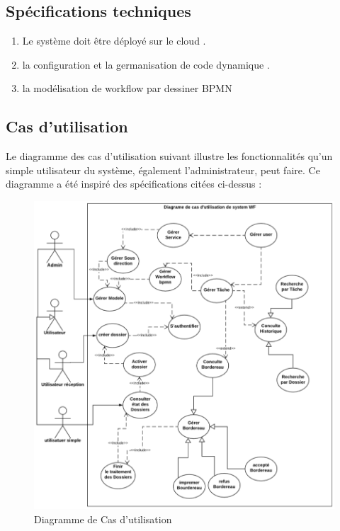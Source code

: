  
 
 
  \subsection{Spécifications techniques }
 
 
 
  \begin{enumerate}
 	\item  	   Le système doit être déployé sur le cloud  .
 	\item  	    la configuration et la germanisation de code dynamique . 
 	\item  	  la modélisation de workflow par dessiner  BPMN
 	
 
 	
 \end{enumerate}
 
 
 
 
 
 
 
 
 
 
 
 \subsection{ Cas d’utilisation }
 Le diagramme des cas d’utilisation suivant illustre les fonctionnalités qu’un simple utilisateur du système, également l’administrateur, peut faire. Ce diagramme a été inspiré des spécifications citées ci-dessus :
 
 \begin{figure}[H]
 	\centering
 	\includegraphics[width=1\linewidth]{images/usercase}
 	\caption{Diagramme de Cas d’utilisation}
 	\label{fig:usercase}
 \end{figure}
 
